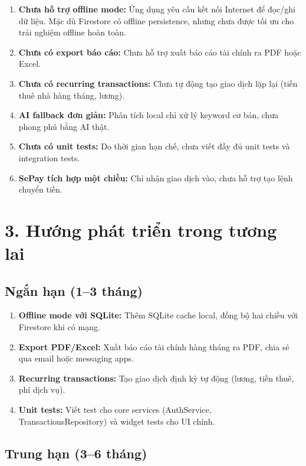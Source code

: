 \begin{enumerate}
  \item \textbf{Chưa hỗ trợ offline mode:} Ứng dụng yêu cầu kết nối Internet để đọc/ghi dữ liệu. Mặc dù Firestore có offline persistence, nhưng chưa được tối ưu cho trải nghiệm offline hoàn toàn.
  \item \textbf{Chưa có export báo cáo:} Chưa hỗ trợ xuất báo cáo tài chính ra PDF hoặc Excel.
  \item \textbf{Chưa có recurring transactions:} Chưa tự động tạo giao dịch lặp lại (tiền thuê nhà hàng tháng, lương).
  \item \textbf{AI fallback đơn giản:} Phân tích local chỉ xử lý keyword cơ bản, chưa phong phú bằng AI thật.
  \item \textbf{Chưa có unit tests:} Do thời gian hạn chế, chưa viết đầy đủ unit tests và integration tests.
  \item \textbf{SePay tích hợp một chiều:} Chỉ nhận giao dịch vào, chưa hỗ trợ tạo lệnh chuyển tiền.
\end{enumerate}

\section*{3. Hướng phát triển trong tương lai}

\subsection*{Ngắn hạn (1--3 tháng)}

\begin{enumerate}
  \item \textbf{Offline mode với SQLite:} Thêm SQLite cache local, đồng bộ hai chiều với Firestore khi có mạng.
  \item \textbf{Export PDF/Excel:} Xuất báo cáo tài chính hàng tháng ra PDF, chia sẻ qua email hoặc messaging apps.
  \item \textbf{Recurring transactions:} Tạo giao dịch định kỳ tự động (lương, tiền thuê, phí dịch vụ).
  \item \textbf{Unit tests:} Viết test cho core services (AuthService, TransactionsRepository) và widget tests cho UI chính.
\end{enumerate}

\subsection*{Trung hạn (3--6 tháng)}

